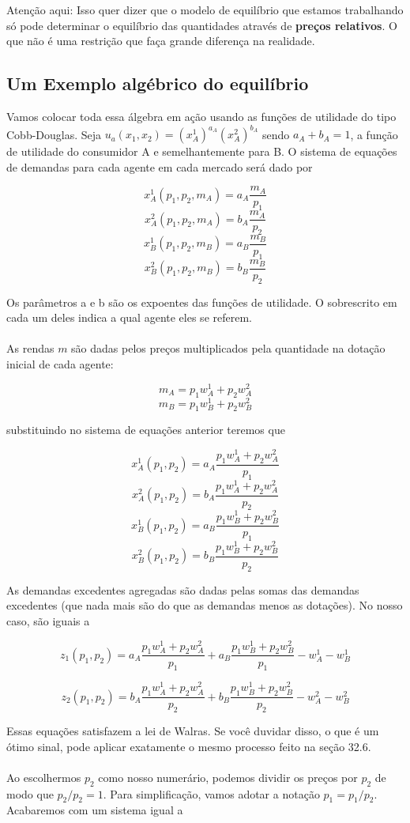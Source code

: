 \documentclass[a4paper,11pt,oneside]{book}
\theoremstyle{definition}
\theoremstyle{break}
\begin{document}
Atenção aqui: Isso quer dizer que o modelo de equilíbrio que estamos trabalhando só pode determinar o equilíbrio das quantidades através de \textbf{preços relativos}. O que não é uma restrição que faça grande diferença na realidade.

\subsection{Um Exemplo algébrico do equilíbrio}

Vamos colocar toda essa álgebra em ação usando as funções de utilidade do tipo Cobb-Douglas. Seja $u_a(x_1,x_2) = (x_A^1)^{a_A}(x_A^2)^{b_A}$ sendo $a_A + b_A = 1$, a função de utilidade do consumidor A e semelhantemente para B. O sistema de equações de demandas para cada agente em cada mercado será dado por

$$ x_A^1(p_1,p_2,m_A) = a_A \frac{m_A}{p_1} $$
$$ x_A^2(p_1,p_2,m_A) = b_A \frac{m_A}{p_2} $$
$$ x_B^1(p_1,p_2,m_B) = a_B \frac{m_B}{p_1} $$
$$ x_B^2(p_1,p_2,m_B) = b_B \frac{m_B}{p_2} $$

Os parâmetros a e b são os expoentes das funções de utilidade. O sobrescrito em cada um deles indica a qual agente eles se referem.
\\
\\
As rendas $m$ são dadas pelos preços multiplicados pela quantidade na dotação inicial de cada agente:

$$m_A = p_1w_A^1 + p_2w_A^2$$
$$m_B = p_1w_B^1 + p_2w_B^2$$

substituindo no sistema de equações anterior teremos que

$$ x_A^1(p_1,p_2) = a_A \frac{p_1w_A^1 + p_2w_A^2}{p_1} $$
$$ x_A^2(p_1,p_2) = b_A \frac{p_1w_A^1 + p_2w_A^2}{p_2} $$
$$ x_B^1(p_1,p_2) = a_B \frac{p_1w_B^1 + p_2w_B^2}{p_1} $$
$$ x_B^2(p_1,p_2) = b_B \frac{p_1w_B^1 + p_2w_B^2}{p_2} $$


As demandas excedentes agregadas são dadas pelas somas das demandas excedentes (que nada mais são do que as demandas menos as dotações). No nosso caso, são iguais a

$$z_1(p_1,p_2) = 
a_A \frac{p_1w_A^1 + p_2w_A^2}{p_1} + 
a_B \frac{p_1w_B^1 + p_2w_B^2}{p_1} - w_A^1 - w_B^1$$

$$z_2(p_1,p_2) = 
b_A \frac{p_1w_A^1 + p_2w_A^2}{p_2} + 
b_B \frac{p_1w_B^1 + p_2w_B^2}{p_2} - w_A^2 - w_B^2$$

Essas equações satisfazem a lei de Walras. Se você duvidar disso, o que é um ótimo sinal, pode aplicar exatamente o mesmo processo feito na seção 32.6.
\\
\\
Ao escolhermos $p_2$ como nosso numerário, podemos dividir os preços por $p_2$ de modo que $p_2/p_2 = 1$. Para simplificação, vamos adotar a notação $p_1 = p_1/p_2$. Acabaremos com um sistema igual a
\end{document}
